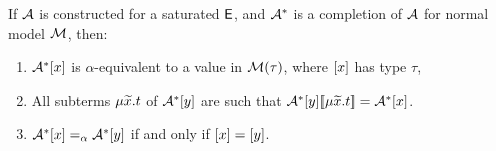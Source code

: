 \begin{lemma}
\label{lem:model-completion}
If $\mathcal{A}$ is constructed for a saturated $\mathsf{E}$,
and $\mathcal{A}^\ast$ is a completion of $\mathcal{A}$ for normal model $\mathcal{M}$, then:
\begin{enumerate}
\item $\mathcal{A}^\ast [x]$ is $\alpha$-equivalent to a value in $\mathcal{M}( \tau )$, where $[x]$ has type $\tau$,
\item
All subterms $\mu {\widetilde{x}}. t$ of $\mathcal{A}^\ast [y]$ are such that
$\mathcal{A}^\ast [y] [\![  \mu {\widetilde{x}}. t  ]\!] = \mathcal{A}^\ast [x]$. 
\item
$\mathcal{A}^\ast [x] \mathrel{=_\alpha} \mathcal{A}^\ast [y]$ if and only if $[x] = [y]$.
\end{enumerate}
\end{lemma}
